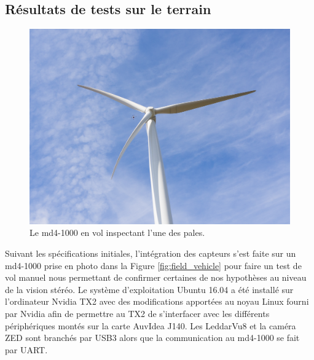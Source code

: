 \clearpage
\subsection{Résultats de tests sur le terrain}
\label{subsec:results_field}

\begin{figure}[htb]
  \centering
  \includegraphics[trim=180 200 180 180,clip,width=\linewidth]{images/test_eolienne.jpg}
  \caption{Le md4-1000 en vol inspectant l'une des pales.}
  \label{fig:test_eolienne}
\end{figure}

Suivant les spécifications initiales, l'intégration des capteurs s'est faite sur un md4-1000 prise en photo dans la Figure \ref{fig:field_vehicle} pour faire un test de vol manuel nous permettant de confirmer certaines de nos hypothèses au niveau de la vision stéréo. Le système d'exploitation Ubuntu 16.04 a été installé sur l'ordinateur Nvidia TX2 avec des modifications apportées au noyau Linux fourni par Nvidia afin de permettre au TX2 de s'interfacer avec les différents périphériques montés sur la carte AuvIdea J140. Les LeddarVu8 et la caméra ZED sont branchés par USB3 alors que la communication au md4-1000 se fait par UART.

